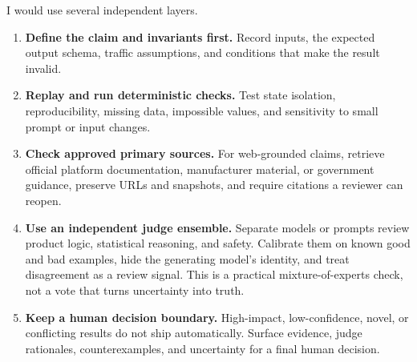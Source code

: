 \documentclass[letterpaper,11pt]{article}
\begin{document}
I would use several independent layers.

\begin{enumerate}
  \item \textbf{Define the claim and invariants first.} Record inputs, the expected output schema, traffic assumptions, and conditions that make the result invalid.
  \item \textbf{Replay and run deterministic checks.} Test state isolation, reproducibility, missing data, impossible values, and sensitivity to small prompt or input changes.
  \item \textbf{Check approved primary sources.} For web-grounded claims, retrieve official platform documentation, manufacturer material, or government guidance, preserve URLs and snapshots, and require citations a reviewer can reopen.
  \item \textbf{Use an independent judge ensemble.} Separate models or prompts review product logic, statistical reasoning, and safety. Calibrate them on known good and bad examples, hide the generating model's identity, and treat disagreement as a review signal. This is a practical mixture-of-experts check, not a vote that turns uncertainty into truth.
  \item \textbf{Keep a human decision boundary.} High-impact, low-confidence, novel, or conflicting results do not ship automatically. Surface evidence, judge rationales, counterexamples, and uncertainty for a final human decision.
\end{enumerate}
\end{document}
